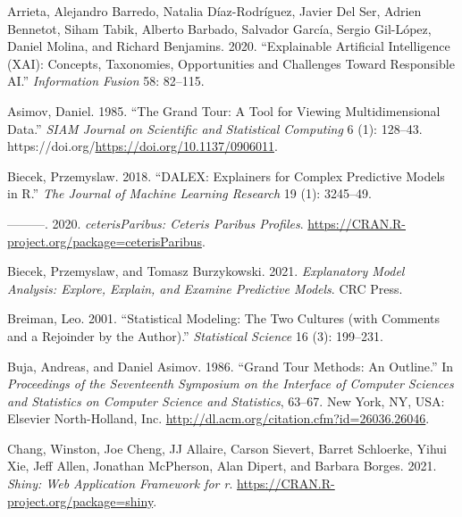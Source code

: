 \documentclass[
]{article}
\newlength{\cslhangindent}
\newlength{\cslentryspacingunit} %
\newenvironment{CSLReferences}[2] %
 {%
  \setlength{\parindent}{0pt}
  \ifodd #1
  \let\oldpar\par
  \def\par{\hangindent=\cslhangindent\oldpar}
  \fi
  \setlength{\parskip}{#2\cslentryspacingunit}
 }%
 {}
\begin{document}
\hypertarget{refs}{}
\begin{CSLReferences}{1}{0}
\leavevmode{}%
Arrieta, Alejandro Barredo, Natalia Díaz-Rodríguez, Javier Del Ser,
Adrien Bennetot, Siham Tabik, Alberto Barbado, Salvador García, Sergio
Gil-López, Daniel Molina, and Richard Benjamins. 2020. {``Explainable
{Artificial} {Intelligence} ({XAI}): {Concepts}, Taxonomies,
Opportunities and Challenges Toward Responsible {AI}.''}
\emph{Information Fusion} 58: 82--115.

\leavevmode{}%
Asimov, Daniel. 1985. {``The {Grand} {Tour}: A {Tool} for {Viewing}
{Multidimensional} {Data}.''} \emph{SIAM Journal on Scientific and
Statistical Computing} 6 (1): 128--43.
https://doi.org/\url{https://doi.org/10.1137/0906011}.

\leavevmode{}%
Biecek, Przemyslaw. 2018. {``{DALEX}: Explainers for Complex Predictive
Models in {R}.''} \emph{The Journal of Machine Learning Research} 19
(1): 3245--49.

\leavevmode{}%
---------. 2020. \emph{{ceterisParibus}: {Ceteris} {Paribus}
{Profiles}}. \url{https://CRAN.R-project.org/package=ceterisParibus}.

\leavevmode{}%
Biecek, Przemyslaw, and Tomasz Burzykowski. 2021. \emph{Explanatory
{Model} {Analysis}: {Explore}, {Explain}, and {Examine} {Predictive}
{Models}}. CRC Press.

\leavevmode{}%
Breiman, Leo. 2001. {``Statistical Modeling: {The} Two Cultures (with
Comments and a Rejoinder by the Author).''} \emph{Statistical Science}
16 (3): 199--231.

\leavevmode{}%
Buja, Andreas, and Daniel Asimov. 1986. {``Grand {Tour} {Methods}: {An}
{Outline}.''} In \emph{Proceedings of the {Seventeenth} {Symposium} on
the {Interface} of {Computer} {Sciences} and {Statistics} on {Computer}
{Science} and {Statistics}}, 63--67. New York, NY, USA: Elsevier
North-Holland, Inc. \url{http://dl.acm.org/citation.cfm?id=26036.26046}.

\leavevmode{}%
Chang, Winston, Joe Cheng, JJ Allaire, Carson Sievert, Barret Schloerke,
Yihui Xie, Jeff Allen, Jonathan McPherson, Alan Dipert, and Barbara
Borges. 2021. \emph{Shiny: Web Application Framework for r}.
\url{https://CRAN.R-project.org/package=shiny}.


\end{CSLReferences}
\end{document}
